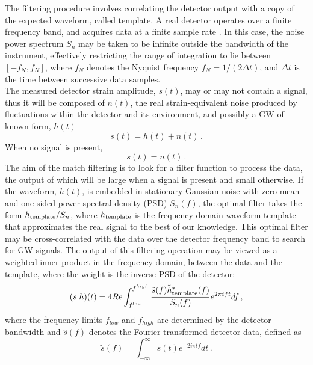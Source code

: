 \documentclass[binding=0.6cm, LaM]{sapthesis}
\begin{document}
	The filtering procedure involves correlating the detector output 
	with a copy of the expected waveform, 
	called template.
	A real detector operates over a finite frequency band, 
	and acquires data at a finite sample rate \cite{24}. 
	In this case, the noise power spectrum $S_n$ 
	may be taken to be infinite outside the bandwidth of the instrument, 
	effectively restricting the range of integration to lie between $[-f_N, f_N]$, 
	where $f_N$ denotes the Nyquist frequency $f_N = 1/(2\Delta t)$, 
	and $\Delta t$ is the time between successive data samples.   \\
	The measured detector strain amplitude, $s(t)$, may or may not contain a signal,
	thus it will be composed of $n(t)$, the real strain-equivalent noise
        produced by fluctuations within the detector and its environment, 
	and possibly a GW of known form, $h(t)$
                \begin{equation}
                \label{eq:strain}        
			s(t) = h(t) + n(t)\,.
                \end{equation}
        When no signal is present,   		
		\begin{equation}
                        s(t) = n(t)\,.
                \end{equation}
        The aim of the match filtering is to look for a filter function to process the data,
	the output of which will be large when a signal is present and small otherwise. 
        If the waveform, $h(t)$, is embedded in stationary Gaussian noise with zero mean and one-sided power-spectral density (PSD) $S_n(f)$,
        the optimal filter takes the form $\tilde h_{\rm template}/S_n$, where $\tilde h_{\rm template}$
        is the frequency domain waveform template that approximates the real signal to the best of our knowledge.
	This optimal filter may be cross-correlated with the data over the detector frequency band to search for GW
        signals.  The output of this filtering operation may be viewed as a weighted inner product in the frequency domain, 
	between the data and the template, where the weight is the inverse PSD of the detector:
		\begin{equation}
 			(s|h)(t) = 4Re \int^{f^{high}}_{f^{low}} {{\tilde s (f) \tilde h^{*}_{\rm template}(f)} \over {S_n (f)}} e^{2 \pi ift}df\,, 
		\end{equation}
	where the frequency limits $f_{low}$ and $f_{high}$ are determined by the detector bandwidth
	and $\hat s(f)$ denotes the Fourier-transformed detector data, defined as
		\begin{equation}
			\tilde s(f) = \int^{\infty}_{-\infty} s(t) e^{-2i \pi tf} dt\,.
		\end{equation}
  
\end{document}
